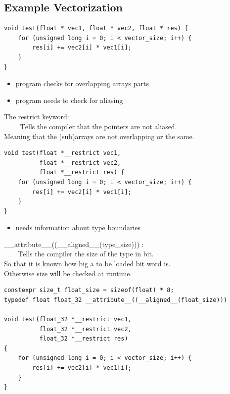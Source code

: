 \documentclass[compress]{beamer}
\begin{document}
\subsection{Example Vectorization}
\begin{frame}[fragile]
    \begin{verbatim}
void test(float * vec1, float * vec2, float * res) {
    for (unsigned long i = 0; i < vector_size; i++) {
        res[i] += vec2[i] * vec1[i];
    }
}
    \end{verbatim}
\end{frame}
\begin{frame}
       \begin{itemize}
        \item program checks for overlapping arrays parts
        \item program needs to check for aliasing            
    \end{itemize}
 \begin{tabbing}
    The restrict keyword: \\
    ~~~~ \= Tells the compiler that the pointers are not aliased. \\
    \> Meaning that the (sub)arrays are not overlapping or the same.
\end{tabbing}

\end{frame}

\begin{frame}[fragile]
    \begin{verbatim}
void test(float *__restrict vec1,
          float *__restrict vec2,
          float *__restrict res) {
    for (unsigned long i = 0; i < vector_size; i++) {
        res[i] += vec2[i] * vec1[i];
    }
}
    \end{verbatim}
\end{frame}
\begin{frame}
    \begin{itemize}
        \item needs information about type boundaries
    \end{itemize}
 \begin{tabbing}
     \_\_attribute\_\_((\_\_aligned\_\_(type\_size))) :\\
~~~~\= Tells the compiler the size of the type in bit. \\
\> So that it is known how big a to be loaded bit word is.\\
\> Otherwise size will be checked at runtime.
\end{tabbing}
\end{frame}
\begin{frame}[fragile]
    \begin{verbatim}
constexpr size_t float_size = sizeof(float) * 8;
typedef float float_32 __attribute__((__aligned__(float_size)))

void test(float_32 *__restrict vec1,
          float_32 *__restrict vec2,
          float_32 *__restrict res) 
{
    for (unsigned long i = 0; i < vector_size; i++) {
        res[i] += vec2[i] * vec1[i];
    }
}
\end{verbatim}
\end{frame}
\end{document}
